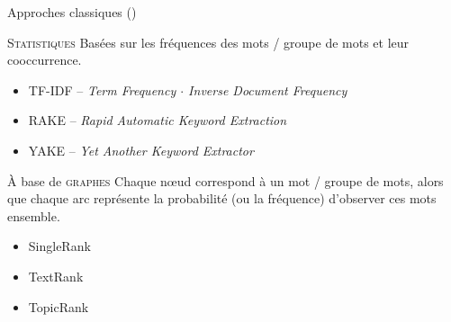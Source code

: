\begin{frame}{Approches classiques {\small(\hypersetup{citecolor=yellow}\cite{garaudclassiques})}}
\begin{block}{\textsc{Statistiques}}
\justifying
Basées sur les fréquences des mots / groupe de mots et leur cooccurrence.
\end{block}

\begin{itemize}
\small
\item \textsc{TF-IDF} -- \textit{Term Frequency $\cdot$ Inverse Document Frequency} {\small\citep{sparck1972statistical}}
\item \textsc{RAKE} -- \textit{Rapid Automatic Keyword Extraction} {\small\citep{rose2010automatic}}
\item \textsc{YAKE} -- \textit{Yet Another Keyword Extractor} {\small\citep{CAMPOS2020257}}
\end{itemize}

\begin{block}{À base de \textsc{graphes}}
\justifying
Chaque nœud correspond à un mot / groupe de mots, alors que chaque arc représente la probabilité (ou la fréquence) d’observer ces mots ensemble.
\end{block}
\begin{itemize}
\small
\item SingleRank {\small\citep{wan2008}}
\item TextRank {\small\citep{mihalcea2004}}
\item TopicRank {\small\citep{bougouin2013topicrank}}
\end{itemize}

\end{frame}

